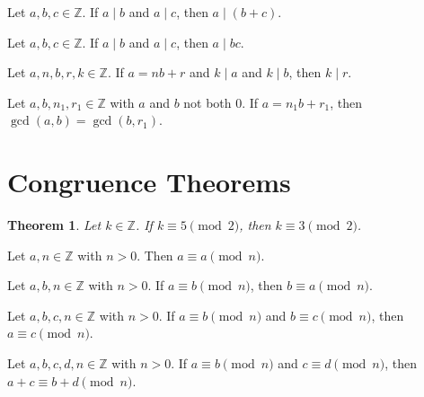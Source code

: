 \documentclass{article}
\newtheorem*{theorem*}{Theorem}
\theoremstyle{definition}
\newenvironment{manualtheorem}[1]{%
  \renewcommand{\thetheorem}{#1}%
  \theorem%
}{%
  \endtheorem%
}
\begin{document}
\begin{manualtheorem}{1.1}
Let $a, b, c \in \mathbb{Z}$. If $a \mid b$ and $a \mid c$, then $a \mid (b + c)$.
\end{manualtheorem}

\begin{manualtheorem}{1.3}
Let $a, b, c \in \mathbb{Z}$. If $a \mid b$ and $a \mid c$, then $a \mid bc$.
\end{manualtheorem}

\begin{manualtheorem}{1.32}
Let $a, n, b, r, k \in \mathbb{Z}$. If $a = nb + r$ and $k \mid a$ and $k \mid b$, then $k \mid r$.
\end{manualtheorem}

\begin{manualtheorem}{1.33}
Let $a, b, n_1, r_1 \in \mathbb{Z}$ with $a$ and $b$ not both $0$. If $a = n_1b + r_1$, then $\gcd(a, b) = \gcd(b, r_1)$.
\end{manualtheorem}

\section{Congruence Theorems}

\begin{theorem*}
Let $k \in \mathbb{Z}$. If $k \equiv 5 \pmod{2}$, then $k \equiv 3 \pmod{2}$.
\end{theorem*}

\begin{manualtheorem}{1.9}
Let $a, n \in \mathbb{Z}$ with $n > 0$. Then $a \equiv a \pmod{n}$.
\end{manualtheorem}

\begin{manualtheorem}{1.10}
Let $a, b, n \in \mathbb{Z}$ with $n > 0$. If $a \equiv b \pmod{n}$, then $b \equiv a \pmod{n}$.
\end{manualtheorem}

\begin{manualtheorem}{1.11}
Let $a, b, c, n \in \mathbb{Z}$ with $n > 0$. If $a \equiv b \pmod{n}$ and $b \equiv c \pmod{n}$, then $a \equiv c \pmod{n}$.
\end{manualtheorem}

\begin{manualtheorem}{1.12}
Let $a, b, c, d, n \in \mathbb{Z}$ with $n > 0$. If $a \equiv b \pmod{n}$ and $c \equiv d \pmod{n}$, then $a + c \equiv b + d \pmod{n}$.
\end{manualtheorem}
\end{document}
